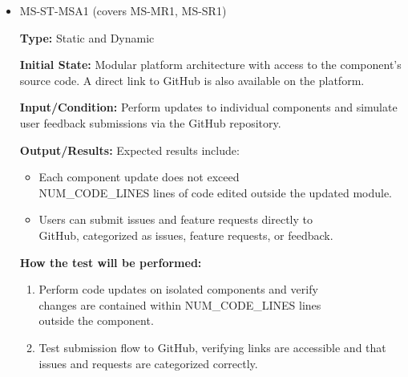 \documentclass[12pt, titlepage]{article}
\begin{document}
\begin{itemize} 
  \item MS-ST-MSA1 (covers MS-MR1, MS-SR1)
  \begin{mdframed}[linewidth=0.5mm] 
    \textbf{Type:} Static and Dynamic \par 
    \textbf{Initial State:} Modular platform architecture with access to the component’s source code. A direct link to GitHub is also available on the platform. \par 
    \textbf{Input/Condition:} Perform updates to individual components and simulate user feedback submissions via the GitHub repository. \par 
    \textbf{Output/Results:} Expected results include: \begin{itemize} \item Each component update does not exceed \\NUM\_CODE\_LINES lines of code edited outside the updated module. 
      \item Users can submit issues and feature requests directly to \\GitHub, categorized as issues, feature requests, or feedback. 
    \end{itemize} \par 
    \textbf{How the test will be performed:} 
    \begin{enumerate}[noitemsep] 
      \item Perform code updates on isolated components and verify \\changes are contained within NUM\_CODE\_LINES lines \\outside the component. 
      \item Test submission flow to GitHub, verifying links are accessible and that issues and requests are categorized correctly. 
    \end{enumerate} 
  \end{mdframed}


\end{itemize}
\end{document}
